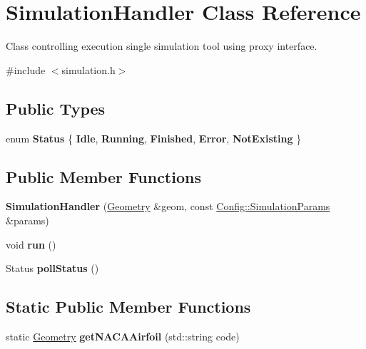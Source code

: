 \hypertarget{class_simulation_handler}{}\section{Simulation\+Handler Class Reference}
\label{class_simulation_handler}


Class controlling execution single simulation tool using proxy interface.  




{\ttfamily \#include $<$simulation.\+h$>$}

\subsection*{Public Types}
\begin{DoxyCompactItemize}
\item 
\mbox{\label{class_simulation_handler_ab8941e6ab3f4e26795276dad882bec9e}} 
enum {\bfseries Status} \{ \newline
{\bfseries Idle}, 
{\bfseries Running}, 
{\bfseries Finished}, 
{\bfseries Error}, 
\newline
{\bfseries Not\+Existing}
 \}
\end{DoxyCompactItemize}
\subsection*{Public Member Functions}
\begin{DoxyCompactItemize}
\item 
\mbox{\label{class_simulation_handler_af10fc8a2ac5266092b65c8fc0246381b}} 
{\bfseries Simulation\+Handler} (\hyperlink{class_geometry}{Geometry} \&geom, const \hyperlink{struct_config_1_1_simulation_params}{Config\+::\+Simulation\+Params} \&params)
\item 
\mbox{\label{class_simulation_handler_af41b1e986949715db1fba23ba73ea9a9}} 
void {\bfseries run} ()
\item 
\mbox{\label{class_simulation_handler_aaad626e05d33b2dc2f1655f1f70225c3}} 
Status {\bfseries poll\+Status} ()
\end{DoxyCompactItemize}
\subsection*{Static Public Member Functions}
\begin{DoxyCompactItemize}
\item 
\mbox{\label{class_simulation_handler_a3ec3a38b7b6a01476136edbe117b7de2}} 
static \hyperlink{class_geometry}{Geometry} {\bfseries get\+N\+A\+C\+A\+Airfoil} (std\+::string code)
\end{DoxyCompactItemize}

